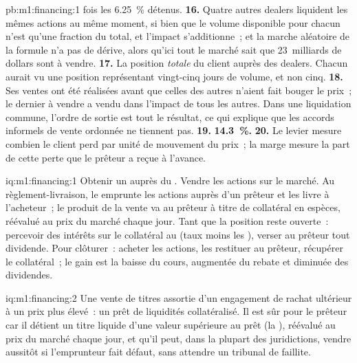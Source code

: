\begin{solution}{pb:m1:financing:1}
fois les 6.25~\% détenus.
\textbf{16.} Quatre autres dealers liquident les mêmes actions au même
moment, si bien que le volume disponible pour chacun n'est qu'une fraction du total, et
l'impact s'additionne~; et la marche aléatoire de la formule n'a pas de dérive, alors qu'ici
tout le marché sait que 23~milliards de dollars sont à vendre.
\textbf{17.} La position \emph{totale} du client auprès des dealers. Chacun aurait
vu une position représentant vingt-cinq jours de volume, et non cinq.
\textbf{18.} Ses ventes ont été réalisées avant que celles des autres n'aient fait bouger le
prix~; le dernier à vendre a vendu dans l'impact de tous les autres. Dans une
liquidation commune, l'ordre de sortie est tout le résultat, ce qui explique que les accords informels
de vente ordonnée ne tiennent pas.
\textbf{19.} \textbf{14.3~\%.}
\textbf{20.} Le levier mesure combien le client perd par unité de
mouvement du prix~; la marge mesure la part de cette perte que le prêteur a reçue
à l'avance.
\end{solution}

\begin{solution}{iq:m1:financing:1}
Obtenir un  auprès du . Vendre les actions sur le marché. Au
règlement-livraison, le  emprunte les actions auprès d'un prêteur et les livre
à l'acheteur~; le produit de la vente va au prêteur à titre de collatéral en espèces,
réévalué au prix du marché chaque jour. Tant que la position reste ouverte~: percevoir des intérêts sur le collatéral au
 (taux moins les ), verser au prêteur tout dividende. Pour clôturer~: acheter
les actions, les restituer au prêteur, récupérer le collatéral~; le gain est
la baisse du cours, augmentée du rebate et diminuée des dividendes.
\end{solution}

\begin{solution}{iq:m1:financing:2}
Une vente de titres assortie d'un engagement de rachat ultérieur à un prix plus
élevé~: un prêt de liquidités collatéralisé. Il est sûr pour le prêteur car il
détient un titre liquide d'une valeur supérieure au prêt (la ), réévalué au
prix du marché chaque jour, et qu'il peut, dans la plupart des juridictions, vendre
aussitôt si l'emprunteur fait défaut, sans attendre un tribunal de faillite.
\end{solution}

